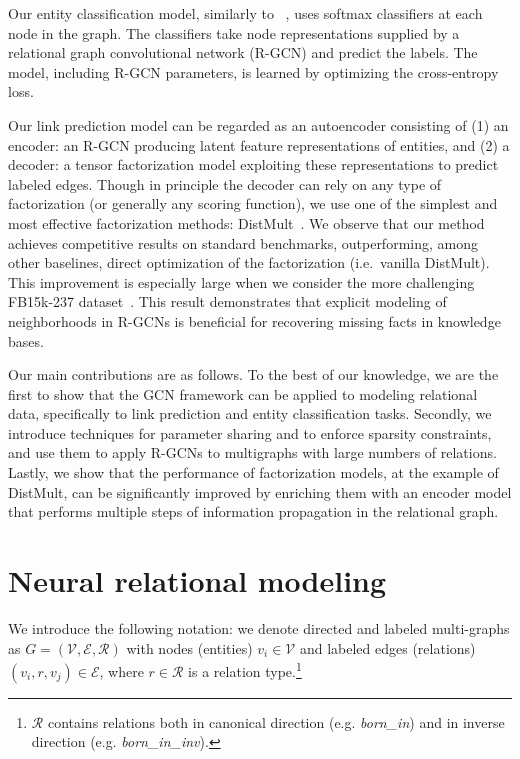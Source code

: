 \documentclass[letterpaper]{article} \usepackage{aaai18}  \usepackage{times}  \usepackage{helvet}  \usepackage{courier}  \usepackage{url}  \usepackage{graphicx}  \frenchspacing
\newcommand{\citet}[1]{\citeauthor{#1}~\shortcite{#1}}
\begin{document}
Our entity classification model, similarly to \citet{kipf2016semi}, uses softmax classifiers at each node in the graph. The classifiers take node representations supplied by a relational graph convolutional network (R-GCN) and predict the labels. The model, including R-GCN parameters, is learned by optimizing the cross-entropy loss.

Our link prediction model can be regarded as an autoencoder consisting of (1) an encoder: an R-GCN producing latent feature representations of entities, and (2) a decoder: a tensor factorization model exploiting these representations to predict labeled edges. Though in principle the decoder can rely on any type of factorization (or generally any scoring function), we use one of the simplest and most effective factorization methods: DistMult~\cite{distmult-embedding_entities_and_relations}. We observe that our method achieves competitive results on standard benchmarks, outperforming, among other baselines, direct optimization of the factorization (i.e.~vanilla DistMult).  This improvement is especially large when we consider the more challenging FB15k-237 dataset~\cite{toutanova2015observed}. This result demonstrates that explicit modeling of neighborhoods in R-GCNs is beneficial for recovering missing facts in knowledge bases.

Our main contributions are as follows. To the best of our knowledge, we are the first to show that the GCN framework can be applied to modeling relational data, specifically to link prediction and entity classification tasks. Secondly, we introduce techniques for parameter sharing and to enforce sparsity constraints, and use them to apply R-GCNs to multigraphs with large numbers of relations. Lastly, we show that the performance of factorization models, at the example of DistMult, can be significantly improved by enriching them with an encoder model that performs multiple steps of information propagation in the relational graph.
 
\section{Neural relational modeling}
We introduce the following notation: we denote directed and labeled multi-graphs as $G = (\mathcal{V}, \mathcal{E}, \mathcal{R})$ with nodes (entities) $v_i \in \mathcal{V}$ and labeled edges (relations) $(v_i, r, v_j) \in \mathcal{E}$, where $r\in\mathcal{R}$ is a relation type.\footnote{$\mathcal{R}$ contains relations both in canonical direction (e.g. \textit{born\_in}) and in inverse direction (e.g. \textit{born\_in\_inv}).}
\end{document}
